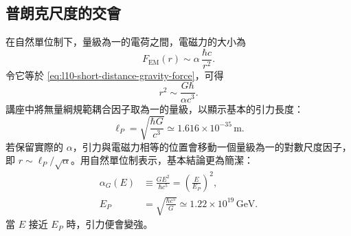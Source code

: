 \begin{classroomqa}
\end{classroomqa}

\subsection{普朗克尺度的交會}

在自然單位制下，量級為一的電荷之間，電磁力的大小為
\begin{equation}
  F_{\mathrm{EM}}(r)
  \sim
  \alpha\,\frac{\hbar c}{r^2}.
  \label{eq:l10-em-force-alpha}
\end{equation}
令它等於 \eqref{eq:l10-short-distance-gravity-force}，可得
\begin{equation}
  r^2\sim\frac{G\hbar}{\alpha c^3}.
  \label{eq:l10-gravity-em-crossing}
\end{equation}
講座中將無量綱規範耦合因子取為一的量級，以顯示基本的引力長度：
\begin{equation}
  \boxed{\ell_P=\sqrt{\frac{\hbar G}{c^3}}}
  \simeq1.616\times10^{-35}\,\mathrm{m}.
  \label{eq:l10-planck-length}
\end{equation}
若保留實際的 \(\alpha\)，引力與電磁力相等的位置會移動一個量級為一的對數尺度因子，即 \(r\sim\ell_P/\sqrt\alpha\)。用自然單位制表示，基本結論更為簡潔：
\begin{equation}
\begin{aligned}
  \alpha_G(E)
  &\equiv\frac{GE^2}{\hbar c^5}
  =\left(\frac{E}{E_P}\right)^2,
  \\
  E_P
  &=\sqrt{\frac{\hbar c^5}{G}}
  \simeq1.22\times10^{19}\,\mathrm{GeV}.
\end{aligned}
  \label{eq:l10-gravitational-coupling}
\end{equation}
當 \(E\) 接近 \(E_P\) 時，引力便會變強。

\begin{classroomqa}
\end{classroomqa}

\begin{classroomqa}
\end{classroomqa}

